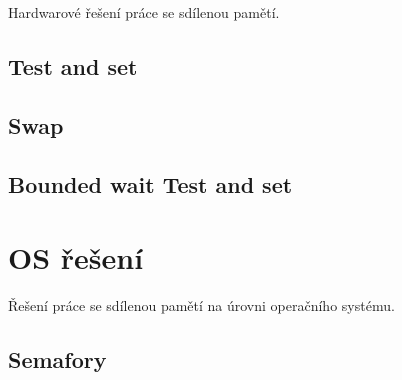 \begin{compactitem}
    \item Hardwarové řešení práce se sdílenou pamětí.
\end{compactitem}

\subsection{Test and set}

\begin{compactitem}
    \item {}
\end{compactitem}

\subsection{Swap}

\begin{compactitem}
    \item {}
\end{compactitem}

\subsection{Bounded wait Test and set}

\begin{compactitem}
    \item {}
\end{compactitem}


\section{OS řešení}

\begin{compactitem}
    \item Řešení práce se sdílenou pamětí na úrovni operačního systému.
\end{compactitem}

\subsection{Semafory}

\begin{compactitem}
    \item {}
\end{compactitem}

